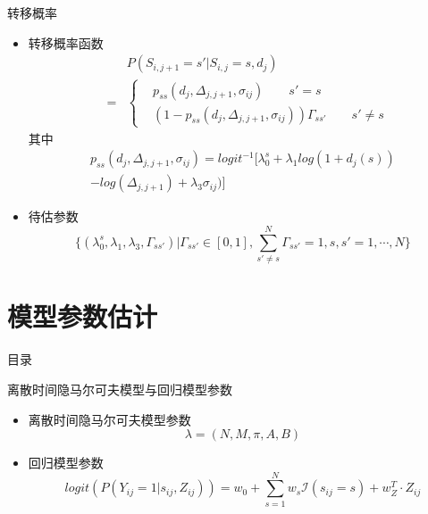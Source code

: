 \documentclass{beamer}
\newcommand{\nb}{\nonumber}
\begin{document}
\begin{frame}{转移概率}
\begin{itemize}
\item
转移概率函数
\begin{eqnarray*}
	 &&P(S_{i,j+1} = s'| S_{i,j} = s,d_j)\nb\\
	 &=&
	\begin{cases}
     	& p_{ss}(d_j,\Delta_{j,j+1},\sigma_{ij}) \qquad s'=s\\	
		& (1-p_{ss}(d_j,\Delta_{j,j+1},\sigma_{ij}))\Gamma_{ss'} \qquad s'\neq s
	\end{cases}
\end{eqnarray*}
其中
\begin{equation}
	\begin{aligned}
		p_{ss}(d_j,\Delta_{j,j+1},\sigma_{ij})
		= logit^{-1}[\lambda_0^s + \lambda_1 log(1+d_j(s))\nb \\
		- log(\Delta_{j,j+1}) + \lambda_3\sigma_{ij}) ] \nb
	\end{aligned}
\end{equation}

\item
待估参数
$$\{(\lambda_0^s,\lambda_1,\lambda_3,\Gamma_{ss'})|\Gamma_{ss'}\in [0,1],\sum_{s'\neq s}^{N}\Gamma_{ss'}=1 ,s,s'=1,\cdots,N\}$$

\end{itemize}
 
\end{frame}



\section{模型参数估计}
\begin{frame}{目录}
\tableofcontents[sectionstyle=show/shaded,subsectionstyle=show/shaded/hide]
\end{frame}

\begin{frame}{离散时间隐马尔可夫模型与回归模型参数}
\begin{itemize}
    \item 离散时间隐马尔可夫模型参数\\
    $$\lambda=(N,M,\pi,A,B)$$
    \item 回归模型参数\\
    $$ logit(P(Y_{ij}=1|s_{ij},Z_{ij}))=w_0+\sum\limits_{s=1}^N w_s \mathcal{I}(s_{ij}=s)+w^T_Z\cdot Z_{ij}$$
\end{itemize}
\end{frame}
\end{document}
